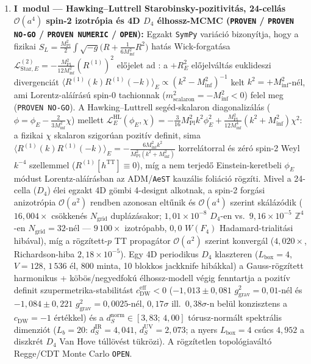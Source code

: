\documentclass[11pt,a4paper]{article}
\begin{document}
\begin{enumerate}
\item \textbf{I~modul --- Hawking--Luttrell Starobinsky-pozitivitás, 24-cellás $\mathcal{O}(a^4)$ spin-2 izotrópia és 4D $D_4$ élhossz-MCMC (\texttt{PROVEN} / \texttt{PROVEN NO-GO} / \texttt{PROVEN NUMERIC} / \texttt{OPEN}):}
Egzakt \texttt{SymPy} variáció bizonyítja, hogy a fizikai $S_L = \frac{M_{\mathrm{Pl}}^2}{2}\int\sqrt{-g}\bigl(R + \frac{1}{6M_{\mathrm{inf}}^2}R^2\bigr)$ hatás Wick-forgatása $\mathcal{L}_{\mathrm{Star},E}^{(2)} = -\frac{M_{\mathrm{Pl}}^2}{12M_{\mathrm{inf}}^2}(R^{(1)})^2$ előjelet ad \cite{HawkingLuttrell1984}: a $+R_E^2$ előjelváltás euklideszi divergenciát $\langle R^{(1)}(k)R^{(1)}(-k)\rangle_E \propto (k^2 - M_{\mathrm{inf}}^2)^{-1}$ kelt $k^2 = +M_{\mathrm{inf}}^2$-nél, ami Lorentz-aláírású spin-0 tachionnak ($m_{\mathrm{scalaron}}^2 = -M_{\mathrm{inf}}^2 < 0$) felel meg (\texttt{PROVEN NO-GO}). A Hawking--Luttrell segéd-skalaron diagonalizálás ($\phi = \phi_E - \frac{2}{3M_{\mathrm{inf}}^2}\chi$) mellett $\mathcal{L}_E^{\mathrm{HL}}(\phi_E,\chi) = -\frac{3}{16}M_{\mathrm{Pl}}^2 k^2\phi_E^2 + \frac{M_{\mathrm{Pl}}^2}{12M_{\mathrm{inf}}^4}(k^2 + M_{\mathrm{inf}}^2)\chi^2$: a fizikai $\chi$ skalaron szigorúan pozitív definit, sima $\langle R^{(1)}(k)R^{(1)}(-k)\rangle_E = -\frac{6M_{\mathrm{inf}}^2 k^2}{M_{\mathrm{Pl}}^2(k^2 + M_{\mathrm{inf}}^2)}$ korrelátorral és zéró spin-2 Weyl $k^{-4}$ szellemmel ($R^{(1)}[h^{\mathrm{TT}}]\equiv 0$), míg a nem terjedő Einstein-keretbeli $\phi_E$ módust Lorentz-aláírásban az ADM/\texttt{AeST} kauzális foliáció rögzíti. Mivel a 24-cella ($D_4$) élei egzakt 4D gömbi 4-designt alkotnak, a spin-2 forgási anizotrópia $\mathcal{O}(a^2)$ rendben azonosan eltűnik és $\mathcal{O}(a^4)$ szerint skálázódik ($16{,}004\times$ csökkenés $N_{\mathrm{grid}}$ duplázásakor; $1{,}01\times 10^{-8}$ $D_4$-en vs.\ $9{,}16\times 10^{-5}$ $\mathbb{Z}^4$-en $N_{\mathrm{grid}}=32$-nél --- $9\,100\times$ izotrópabb, $0{,}0$ $W(F_4)$ Hadamard-trialitási hibával), míg a rögzített-$p$ TT propagátor $\mathcal{O}(a^2)$ szerint konvergál ($4{,}020\times$, Richardson-hiba $2{,}18\times 10^{-5}$). Egy 4D periodikus $D_4$ klaszteren ($L_{\mathrm{box}}=4$, $V=128$, $1\,536$ él, $800$ minta, 10 blokkos jackknife hibákkal) a Gauss-rögzített harmonikus + köbös/negyedfokú élhossz-modell végig fenntartja a pozitív definit szupermetrika-stabilitást $c_{\mathrm{DW}}^{\mathrm{eff}} < 0$ ($-1{,}013 \pm 0{,}081$ $g_{\mathrm{grav}}^2=0{,}01$-nél és $-1{,}084 \pm 0{,}221$ $g_{\mathrm{grav}}^2=0{,}0025$-nél, $0{,}17\sigma$ ill.\ $0{,}38\sigma$-n belül konzisztens a $c_{\mathrm{DW}}=-1$ értékkel) és a $d_S^{\mathrm{norm}}\in[3{,}83;\,4{,}00]$ tórusz-normált spektrális dimenziót ($L_b=20$: $d_S^{\mathrm{IR}}=4{,}041$, $d_S^{\mathrm{UV}}=2{,}073$; a nyers $L_{\mathrm{box}}=4$ csúcs $4{,}952$ a diszkrét $D_4$ Van Hove túllövést tükrözi). A rögzítetlen topológiaváltó Regge/CDT Monte Carlo \texttt{OPEN}.


\end{enumerate}
\end{document}
